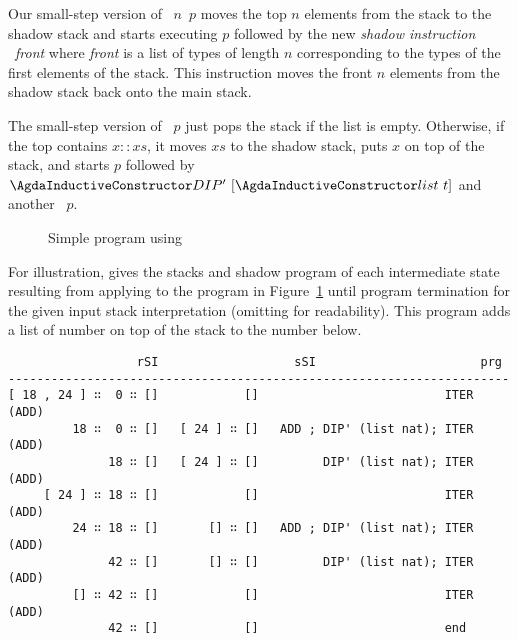Our small-step version of ~$n$~$p$ moves the top $n$ elements from the stack
to the shadow stack and starts executing $p$ followed by 
the new \emph{shadow instruction} ~\textit{front} where
\textit{front} is a list of types of length $n$ corresponding to the
types of the first elements of the stack. This instruction moves the
front $n$ elements from the shadow stack back onto the main stack. 

The small-step version of ~$p$ just pops the stack if the
list is empty.
Otherwise, if the top contains $x :: xs$, it moves $xs$ to the shadow
stack, puts $x$ on top of the stack, and starts $p$ followed by
$\ACon{DIP'}~[\ACon{list}~t]$ and another ~$p$. 

\begin{figure}[tp]
  \ConcreteExampleITER
  \caption{Simple program using }
  \label{fig:ITER-ADD}
\end{figure}
For illustration, 
 gives the stacks and shadow program of
each intermediate state resulting from applying  to
the program in Figure~\ref{fig:ITER-ADD} until program termination
for the given input stack interpretation (omitting  for
readability).
This program adds a list of number on top of the stack to the number below.

\begin{table}[tp]
\begin{verbatim}
                  rSI                   sSI                       prg
----------------------------------------------------------------------
[ 18 , 24 ] ∷  0 ∷ []            []                          ITER (ADD)
         18 ∷  0 ∷ []   [ 24 ] ∷ []   ADD ; DIP' (list nat); ITER (ADD)
              18 ∷ []   [ 24 ] ∷ []         DIP' (list nat); ITER (ADD)
     [ 24 ] ∷ 18 ∷ []            []                          ITER (ADD)
         24 ∷ 18 ∷ []       [] ∷ []   ADD ; DIP' (list nat); ITER (ADD)
              42 ∷ []       [] ∷ []         DIP' (list nat); ITER (ADD)
         [] ∷ 42 ∷ []            []                          ITER (ADD)
              42 ∷ []            []                          end
\end{verbatim}
\caption{Program states during execution of Figure~\ref{fig:ITER-ADD}}
\label{prog-step:ITER-ADD}
\end{table}

